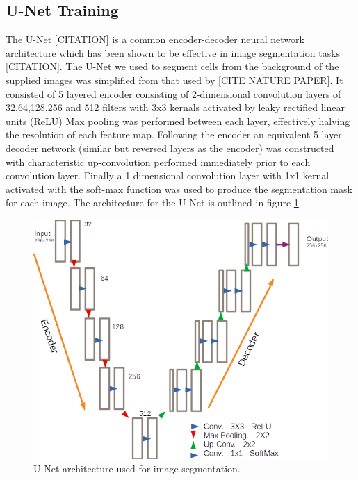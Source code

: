 \documentclass[isoft]{poster_class_UofC}
\begin{document}
\begin{poster}
        \subsection{U-Net Training}
The U-Net [CITATION] is a common encoder-decoder neural network architecture which has been shown to be effective in image segmentation tasks [CITATION]. The U-Net we used to segment cells from the background of the supplied images was simplified from that used by [CITE NATURE PAPER].  It consisted of 5 layered encoder consisting of 2-dimensional convolution layers of 32,64,128,256 and 512 filters with 3x3 kernals activated by leaky rectified linear units (ReLU) Max pooling was performed between each layer, effectively halving the resolution of each feature map.  Following the encoder an equivalent 5 layer decoder network (similar but reversed layers as the encoder) was constructed with characteristic up-convolution performed immediately prior to each convolution layer.  Finally a 1 dimensional convolution layer with 1x1 kernal activated with the soft-max function was used to produce the segmentation mask for each image. The architecture for the U-Net is outlined in figure \ref{fig:U-NET}.
        
        \begin{figure}
                    \centering
            \captionsetup{type=figure}
            \includegraphics[scale=1]{./images/UNet_Arch.png}
            \caption{U-Net architecture used for image segmentation.}
            \label{fig:U-NET}
        \end{figure}
        

\end{poster}
\end{document}
